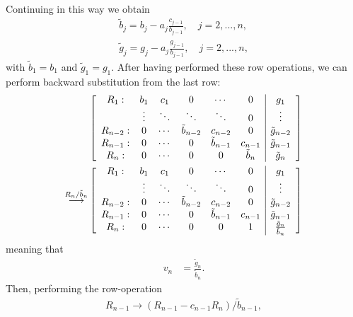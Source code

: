 \documentclass[english,notitlepage,reprint,nofootinbib]{revtex4-2}  %
\begin{document}
\begin{widetext}
\begin{align}
\end{align}
Continuing in this way we obtain 
\begin{subequations}    \label{eq:tilde_b_ntilde_g}
\begin{align}
    \tilde{b}_{j} = b_{j} - a_{j}\frac{c_{j-1}}{b_{j-1}}, \quad j=2,..., n,   \label{eq:tilde_b}\\ 
    \tilde{g}_{j} = g_{j} - a_{j}\frac{g_{j-1}}{b_{j-1}}, \quad j=2,..., n,   \label{eq:tilde_g}
\end{align}
\end{subequations}
with \(\tilde{b}_1 = b_1\) and \(\tilde{g}_1 = g_1\). After having performed these row operations, we can perform backward substitution from the last row:
\begin{align}
    &\left[\begin{array}{cccccc|c}
        R_1: & b_1 & c_1 & 0 & \cdots & 0  & g_1\\
        \ & \vdots & \ddots & \ddots & \ddots & 0  & \vdots \\
        R_{n-2}:   & 0 & \cdots & \tilde{b}_{n-2} & c_{n-2} & 0 & \tilde{g}_{n-2} \\
        R_{n-1}: & 0 & \cdots & 0 & \tilde{b}_{n-1} & c_{n-1} & \tilde{g}_{n-1} \\
        R_{n}: & 0 & \cdots & 0 & 0 & \tilde{b}_{n} & \tilde{g}_{n} 
    \end{array}\right]
    \notag \\
    \overset{R_{n}/\tilde{b}_{n}}{\longrightarrow} 
    &\left[\begin{array}{cccccc|c}
        R_1: & b_1 & c_1 & 0 & \cdots & 0  & g_1\\
        \ & \vdots & \ddots & \ddots & \ddots & 0  & \vdots \\
        R_{n-2}:   & 0 & \cdots & \tilde{b}_{n-2} & c_{n-2} & 0 & \tilde{g}_{n-2} \\
        R_{n-1}: & 0 & \cdots & 0 & \tilde{b}_{n-1} & c_{n-1} & \tilde{g}_{n-1} \\
        R_{n}: & 0 & \cdots & 0 & 0 & 1 & \frac{\tilde{g}_{n}}{\tilde{b}_{n}}
    \end{array}\right]
\end{align}
meaning that 
\begin{align}
    v_{n} &= \frac{\tilde{g}_{n}}{\tilde{b}_{n}}. \label{eq:last_v}
\end{align}
Then, performing the row-operation 
\begin{align}
    R_{n-1}\rightarrow (R_{n-1} - c_{n-1}R_{n})/\tilde{b}_{n-1},
\end{align}

\end{widetext}
\end{document}
